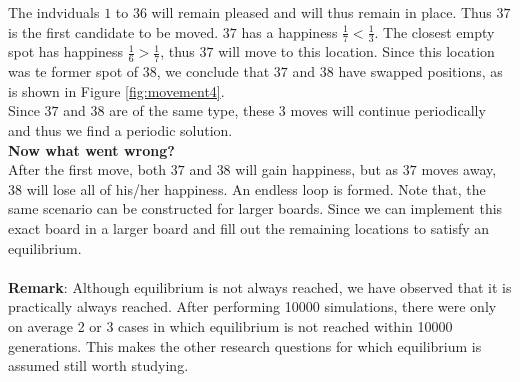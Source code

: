 The indviduals \(1\) to \(36\) will remain pleased and will thus remain in place. 
Thus $37$ is the first candidate to be moved. $37$ has a happiness $\frac{1}{7} < \frac{1}{3}$. 
The closest empty spot has happiness $\frac{1}{6} > \frac{1}{7}$, thus $37$ will move to this location. 
Since this location was te former spot of \(38\), we conclude that  $37$ and $38$ have swapped positions, as is shown in Figure \ref{fig:movement4}.\\
Since $37$ and $38$ are of the same type, these $3$ moves will continue periodically and thus we find a periodic solution.\\

\textbf{Now what went wrong?} \\
After the first move, both $37$ and $38$ will gain happiness, but as \(37\) moves away, $38$ will lose all of his/her happiness. 
An endless loop is formed.
Note that, the same scenario can be constructed for larger boards. 
Since we can implement this exact board in a larger board and fill out the remaining locations to satisfy an equilibrium.\\
\\
\textbf{Remark}: Although equilibrium is not always reached, we have observed that it is practically always reached. After performing 10000 simulations, there were only on average 2 or 3 cases in which equilibrium is not reached within 10000 generations. This makes the other research questions for which equilibrium is assumed still worth studying.
